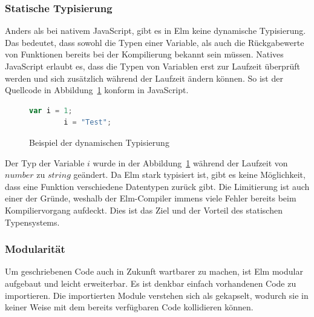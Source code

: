 \subsubsection{Statische Typisierung}
\label{sec:Statische Typisierung}
Anders als bei nativem JavaScript, gibt es in Elm keine dynamische Typisierung. Das bedeutet, dass sowohl die Typen einer Variable, als auch die Rückgabewerte von Funktionen bereits bei der Kompilierung bekannt sein müssen. Natives JavaScript erlaubt es, dass die Typen von Variablen erst zur Laufzeit überprüft werden und sich zusätzlich während der Laufzeit ändern können. So ist der Quellcode in Abbildung~\ref{fig:dynamische-typisierung} konform in JavaScript.
\begin{figure}[ht]
	\centering
		\begin{lstlisting}[language=JavaScript]
		var i = 1;
		i = "Test";
		\end{lstlisting}
\caption{Beispiel der dynamischen Typisierung}\label{fig:dynamische-typisierung}
\end{figure}
Der Typ der Variable $i$ wurde in der Abbildung~\ref{fig:dynamische-typisierung} während der Laufzeit von $number$ zu $string$ geändert. Da Elm stark typisiert ist, gibt es keine Möglichkeit, dass eine Funktion verschiedene Datentypen zurück gibt. Die Limitierung ist auch einer der Gründe, weshalb der Elm-Compiler immens viele Fehler bereits beim Kompiliervorgang aufdeckt. Dies ist das Ziel und der Vorteil des statischen Typensystems.

\subsubsection{Modularität}
\label{sec:Modularität}
Um geschriebenen Code auch in Zukunft wartbarer zu machen, ist Elm modular aufgebaut und leicht erweiterbar. Es ist denkbar einfach vorhandenen Code zu importieren. Die importierten Module verstehen sich als gekapselt, wodurch sie in keiner Weise mit dem bereits verfügbaren Code kollidieren können.


